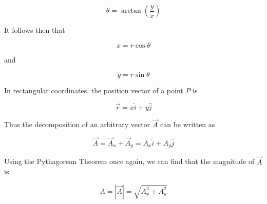         \[
            \theta = \arctan{\left(\frac{y}{x}\right)}
        \]

        It follows then that

        \[
            x = r\cos{\theta}
        \]

        and

        \[
            y = r\sin{\theta}
        \]

        In rectangular coordinates, the position vector of a point $P$ is

        \[
            \vec{r} = x \hat{i} + y \hat{j}
        \]

        Thus the decomposition of an arbitrary vector $\vec{A}$ can be written as

        \[
            \vec{A} = \vec{A}_x + \vec{A}_y = A_x \hat{i} + A_y \hat{j}
        \]

        Using the Pythagorean Theorem once again, we can find that the magnitude of $\vec{A}$ is

        \[
            A = |\vec{A}| = \sqrt{A^2_x + A^2_y}
        \]

